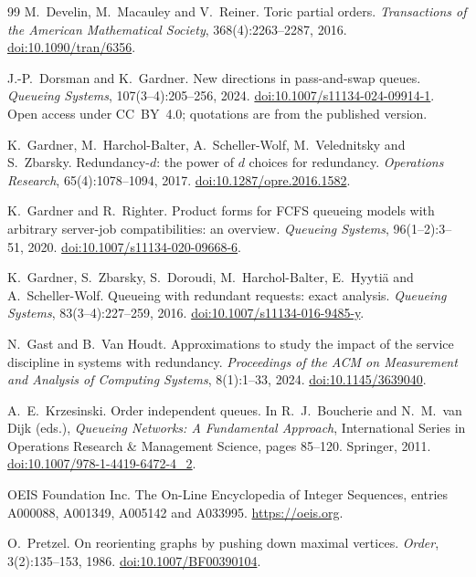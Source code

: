 \documentclass[11pt,a4paper]{article}
\theoremstyle{plain}
\theoremstyle{plain}
\begin{document}
\begin{thebibliography}{99}
M.~Develin, M.~Macauley and V.~Reiner.
Toric partial orders.
\emph{Transactions of the American Mathematical Society}, 368(4):2263--2287, 2016.
\href{https://doi.org/10.1090/tran/6356}{doi:10.1090/tran/6356}.

J.-P.~Dorsman and K.~Gardner.
New directions in pass-and-swap queues.
\emph{Queueing Systems}, 107(3--4):205--256, 2024.
\href{https://doi.org/10.1007/s11134-024-09914-1}{doi:10.1007/s11134-024-09914-1}. Open access under CC~BY~4.0; quotations are from the published version.

K.~Gardner, M.~Harchol-Balter, A.~Scheller-Wolf, M.~Velednitsky and S.~Zbarsky.
Redundancy-$d$: the power of $d$ choices for redundancy.
\emph{Operations Research}, 65(4):1078--1094, 2017.
\href{https://doi.org/10.1287/opre.2016.1582}{doi:10.1287/opre.2016.1582}.

K.~Gardner and R.~Righter.
Product forms for FCFS queueing models with arbitrary server-job compatibilities: an overview.
\emph{Queueing Systems}, 96(1--2):3--51, 2020.
\href{https://doi.org/10.1007/s11134-020-09668-6}{doi:10.1007/s11134-020-09668-6}.

K.~Gardner, S.~Zbarsky, S.~Doroudi, M.~Harchol-Balter, E.~Hyyti\"a and A.~Scheller-Wolf.
Queueing with redundant requests: exact analysis.
\emph{Queueing Systems}, 83(3--4):227--259, 2016.
\href{https://doi.org/10.1007/s11134-016-9485-y}{doi:10.1007/s11134-016-9485-y}.

N.~Gast and B.~Van Houdt.
Approximations to study the impact of the service discipline in systems with redundancy.
\emph{Proceedings of the ACM on Measurement and Analysis of Computing Systems}, 8(1):1--33, 2024.
\href{https://doi.org/10.1145/3639040}{doi:10.1145/3639040}.

A.~E.~Krzesinski.
Order independent queues.
In R.~J.~Boucherie and N.~M.~van Dijk (eds.), \emph{Queueing Networks: A Fundamental Approach}, International Series in Operations Research \& Management Science, pages 85--120. Springer, 2011.
\href{https://doi.org/10.1007/978-1-4419-6472-4_2}{doi:10.1007/978-1-4419-6472-4\_2}.

OEIS Foundation Inc.
The On-Line Encyclopedia of Integer Sequences, entries A000088, A001349, A005142 and A033995.
\url{https://oeis.org}.

O.~Pretzel.
On reorienting graphs by pushing down maximal vertices.
\emph{Order}, 3(2):135--153, 1986.
\href{https://doi.org/10.1007/BF00390104}{doi:10.1007/BF00390104}.


\end{thebibliography}
\end{document}
